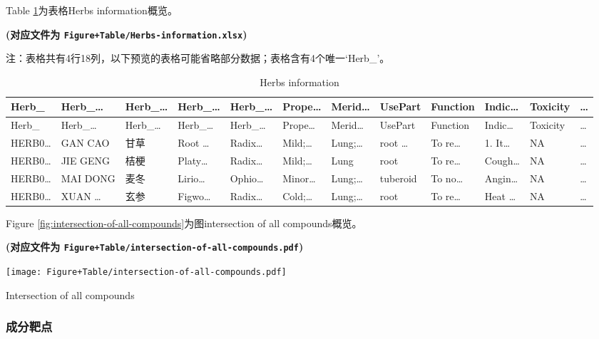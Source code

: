 \documentclass[
]{article}
\begin{document}
Table \ref{tab:Herbs-information}为表格Herbs information概览。

\textbf{(对应文件为 \texttt{Figure+Table/Herbs-information.xlsx})}

\begin{center}\begin{tcolorbox}[colback=gray!10, colframe=gray!50, width=0.9\linewidth, arc=1mm, boxrule=0.5pt]注：表格共有4行18列，以下预览的表格可能省略部分数据；表格含有4个唯一`Herb\_'。
\end{tcolorbox}
\end{center}

\begin{longtable}[]{@{}llllllllllll@{}}
\caption{\label{tab:Herbs-information}Herbs information}\tabularnewline
\toprule
Herb\_ & Herb\_\ldots{} & Herb\_\ldots{} & Herb\_\ldots{} & Herb\_\ldots{} & Prope\ldots{} & Merid\ldots{} & UsePart & Function & Indic\ldots{} & Toxicity & \ldots{}\tabularnewline
\midrule
\endfirsthead
\toprule
Herb\_ & Herb\_\ldots{} & Herb\_\ldots{} & Herb\_\ldots{} & Herb\_\ldots{} & Prope\ldots{} & Merid\ldots{} & UsePart & Function & Indic\ldots{} & Toxicity & \ldots{}\tabularnewline
\midrule
\endhead
HERB0\ldots{} & GAN CAO & 甘草 & Root \ldots{} & Radix\ldots{} & Mild;\ldots{} & Lung;\ldots{} & root \ldots{} & To re\ldots{} & 1. It\ldots{} & NA & \ldots{}\tabularnewline
HERB0\ldots{} & JIE GENG & 桔梗 & Platy\ldots{} & Radix\ldots{} & Mild;\ldots{} & Lung & root & To re\ldots{} & Cough\ldots{} & NA & \ldots{}\tabularnewline
HERB0\ldots{} & MAI DONG & 麦冬 & Lirio\ldots{} & Ophio\ldots{} & Minor\ldots{} & Lung;\ldots{} & tuberoid & To no\ldots{} & Angin\ldots{} & NA & \ldots{}\tabularnewline
HERB0\ldots{} & XUAN \ldots{} & 玄参 & Figwo\ldots{} & Radix\ldots{} & Cold;\ldots{} & Lung;\ldots{} & root & To re\ldots{} & Heat \ldots{} & NA & \ldots{}\tabularnewline
\bottomrule
\end{longtable}

Figure \ref{fig:intersection-of-all-compounds}为图intersection of all compounds概览。

\textbf{(对应文件为 \texttt{Figure+Table/intersection-of-all-compounds.pdf})}

\def\@captype{figure}
\begin{center}
\texttt{[image: Figure+Table/intersection-of-all-compounds.pdf]}
\caption{Intersection of all compounds}\label{fig:intersection-of-all-compounds}
\end{center}

\hypertarget{ux6210ux5206ux9776ux70b9}{%
\subsubsection{成分靶点}\label{ux6210ux5206ux9776ux70b9}}
\end{document}
